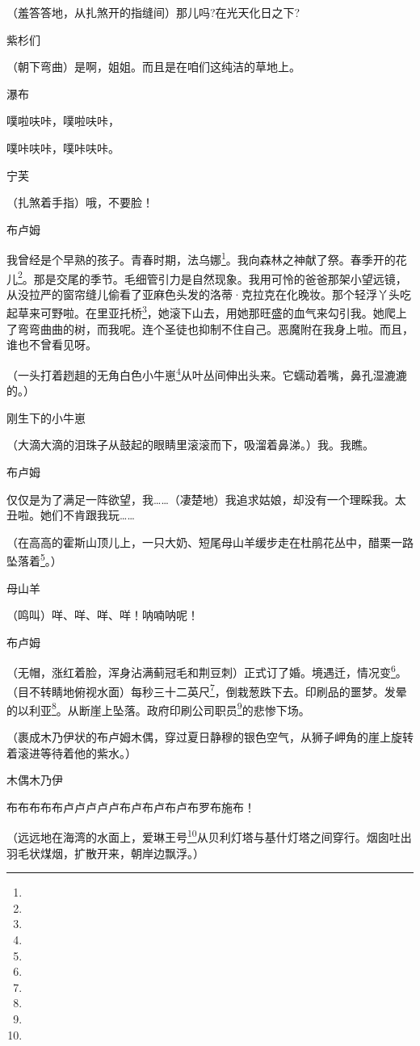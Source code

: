 \par （羞答答地，从扎煞开的指缝间）那儿吗?在光天化日之下?
\par 紫杉们
\par （朝下弯曲）是啊，姐姐。而且是在咱们这纯洁的草地上。
\par 瀑布
\par 噗啦呋咔，噗啦呋咔，
\par 噗咔呋咔，噗咔呋咔。
\par 宁芙
\par （扎煞着手指）哦，不要脸！
\par 布卢姆
\par 我曾经是个早熟的孩子。青春时期，法乌娜\footnote{}。我向森林之神献了祭。春季开的花儿\footnote{}。那是交尾的季节。毛细管引力是自然现象。我用可怜的爸爸那架小望远镜，从没拉严的窗帘缝儿偷看了亚麻色头发的洛蒂·克拉克在化晚妆。那个轻浮丫头吃起草来可野啦。在里亚托桥\footnote{}，她滚下山去，用她那旺盛的血气来勾引我。她爬上了弯弯曲曲的树，而我呢。连个圣徒也抑制不住自己。恶魔附在我身上啦。而且，谁也不曾看见呀。
\par （一头打着趔趄的无角白色小牛崽\footnote{}从叶丛间伸出头来。它蠕动着嘴，鼻孔湿漉漉的。）
\par 刚生下的小牛崽
\par （大滴大滴的泪珠子从鼓起的眼睛里滚滚而下，吸溜着鼻涕。）我。我瞧。
\par 布卢姆
\par 仅仅是为了满足一阵欲望，我……（凄楚地）我追求姑娘，却没有一个理睬我。太丑啦。她们不肯跟我玩……
\par （在高高的霍斯山顶儿上，一只大奶、短尾母山羊缓步走在杜鹃花丛中，醋栗一路坠落着\footnote{}。）
\par 母山羊
\par （鸣叫）咩、咩、咩、咩！呐喃呐呢！
\par 布卢姆
\par （无帽，涨红着脸，浑身沾满蓟冠毛和荆豆刺）正式订了婚。境遇迁，情况变\footnote{}。（目不转睛地俯视水面）每秒三十二英尺\footnote{}，倒栽葱跌下去。印刷品的噩梦。发晕的以利亚\footnote{}。从断崖上坠落。政府印刷公司职员\footnote{}的悲惨下场。
\par （裹成木乃伊状的布卢姆木偶，穿过夏日静穆的银色空气，从狮子岬角的崖上旋转着滚进等待着他的紫水。）
\par 木偶木乃伊
\par 布布布布布卢卢卢卢卢布卢布卢布卢布罗布施布！
\par （远远地在海湾的水面上，爱琳王号\footnote{}从贝利灯塔与基什灯塔之间穿行。烟囱吐出羽毛状煤烟，扩散开来，朝岸边飘浮。）
